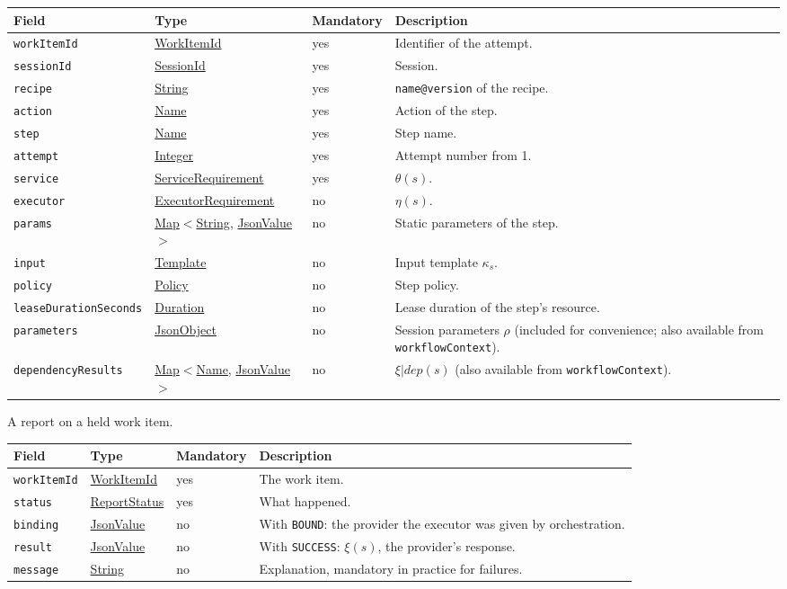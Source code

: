 \documentclass[a4paper]{arrowhead}
\newcommand{\mref}[1]{{\textcolor{ArrowheadPurple}{\hyperref[sec:model:#1]{#1}}}}
\newcommand{\pref}[1]{{\textcolor{ArrowheadGrey}{\hyperref[sec:model:primitives:#1]{#1}}}}
\begin{document}
{\small
\begin{longtable}{|p{3.7cm}|p{4.2cm}|p{1.6cm}|p{6.3cm}|}

\hline
\rowcolor{gray!33} Field & Type & Mandatory & Description \\ \hline
\endhead
\texttt{workItemId} & \pref{WorkItemId} & yes & Identifier of the attempt. \\ \hline
\texttt{sessionId} & \pref{SessionId} & yes & Session. \\ \hline
\texttt{recipe} & \pref{String} & yes & \texttt{name@version} of the recipe. \\ \hline
\texttt{action} & \pref{Name} & yes & Action of the step. \\ \hline
\texttt{step} & \pref{Name} & yes & Step name. \\ \hline
\texttt{attempt} & \pref{Integer} & yes & Attempt number from 1. \\ \hline
\texttt{service} & \mref{ServiceRequirement} & yes & $\theta(s)$. \\ \hline
\texttt{executor} & \mref{ExecutorRequirement} & no & $\eta(s)$. \\ \hline
\texttt{params} & \pref{Map}$<$\pref{String}, \pref{JsonValue}$>$ & no & Static parameters of the step. \\ \hline
\texttt{input} & \pref{Template} & no & Input template $\kappa_s$. \\ \hline
\texttt{policy} & \mref{Policy} & no & Step policy. \\ \hline
\texttt{leaseDurationSeconds} & \pref{Duration} & no & Lease duration of the step's resource. \\ \hline
\texttt{parameters} & \pref{JsonObject} & no & Session parameters $\rho$ (included for convenience; also available from \texttt{workflowContext}). \\ \hline
\texttt{dependencyResults} & \pref{Map}$<$\pref{Name}, \pref{JsonValue}$>$ & no & $\xi|dep(s)$ (also available from \texttt{workflowContext}). \\ \hline
\end{longtable}
}

A report on a held work item.

{\small
\begin{longtable}{|p{3.7cm}|p{4.2cm}|p{1.6cm}|p{6.3cm}|}

\hline
\rowcolor{gray!33} Field & Type & Mandatory & Description \\ \hline
\endhead
\texttt{workItemId} & \pref{WorkItemId} & yes & The work item. \\ \hline
\texttt{status} & \mref{ReportStatus} & yes & What happened. \\ \hline
\texttt{binding} & \pref{JsonValue} & no & With \texttt{BOUND}: the provider the executor was given by orchestration. \\ \hline
\texttt{result} & \pref{JsonValue} & no & With \texttt{SUCCESS}: $\xi(s)$, the provider's response. \\ \hline
\texttt{message} & \pref{String} & no & Explanation, mandatory in practice for failures. \\ \hline
\end{longtable}
}
\end{document}
